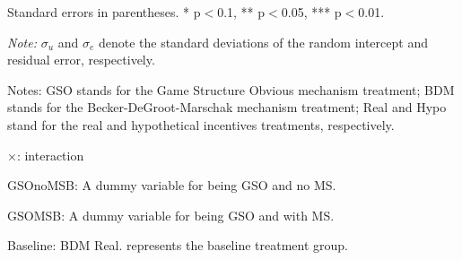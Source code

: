 \documentclass[12pt]{article}
\begin{document}
\begin{table}[H]
\begin{tablenotes}
            \footnotesize
            \item Standard errors in parentheses. * p$<$0.1, ** p$<$0.05, *** p$<$0.01.
            \item \textit{Note:} $\sigma_u$ and $\sigma_e$ denote the standard deviations of the random intercept and residual error, respectively.
            \item Notes: GSO stands for the Game Structure Obvious mechanism treatment; BDM stands for the Becker-DeGroot-Marschak mechanism treatment; Real and Hypo stand for the real and hypothetical incentives treatments, respectively.
           \item $\times$: interaction
           \item GSOnoMSB: A dummy variable for being GSO and no MS.
           \item GSOMSB: A dummy variable for being GSO and with MS.
           \item Baseline: BDM Real. represents the baseline treatment group.
        \end{tablenotes}
            \end{table}








\clearpage


    \begin{table}[htbp!]
        \centering
        \caption{Two-Sample Test of Proportions (complexity above median)}
        \label{tab:Appendix_proportion_test}
    \end{table}
\end{document}
